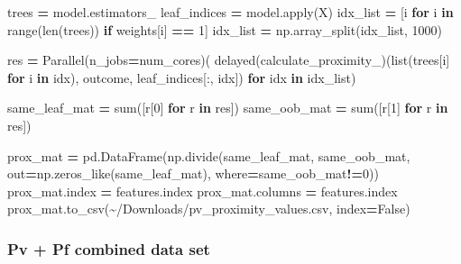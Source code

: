 \documentclass[
  11pt,
  oneside]{book}
\newenvironment{Shaded}{\begin{snugshade}}{\end{snugshade}}
\newcommand{\BuiltInTok}[1]{#1}
\newcommand{\ControlFlowTok}[1]{\textcolor[rgb]{0.13,0.29,0.53}{\textbf{#1}}}
\newcommand{\DecValTok}[1]{\textcolor[rgb]{0.00,0.00,0.81}{#1}}
\newcommand{\KeywordTok}[1]{\textcolor[rgb]{0.13,0.29,0.53}{\textbf{#1}}}
\newcommand{\NormalTok}[1]{#1}
\newcommand{\OperatorTok}[1]{\textcolor[rgb]{0.81,0.36,0.00}{\textbf{#1}}}
\newcommand{\StringTok}[1]{\textcolor[rgb]{0.31,0.60,0.02}{#1}}
\newcommand{\VariableTok}[1]{\textcolor[rgb]{0.00,0.00,0.00}{#1}}
\begin{document}
\begin{Shaded}
\begin{Highlighting}[]
\NormalTok{trees }\OperatorTok{=}\NormalTok{ model.estimators\_}
\NormalTok{leaf\_indices }\OperatorTok{=}\NormalTok{ model.}\BuiltInTok{apply}\NormalTok{(X)}
\NormalTok{idx\_list }\OperatorTok{=}\NormalTok{ [i }\ControlFlowTok{for}\NormalTok{ i }\KeywordTok{in} \BuiltInTok{range}\NormalTok{(}\BuiltInTok{len}\NormalTok{(trees)) }\ControlFlowTok{if}\NormalTok{ weights[i] }\OperatorTok{==} \DecValTok{1}\NormalTok{]}
\NormalTok{idx\_list }\OperatorTok{=}\NormalTok{ np.array\_split(idx\_list, }\DecValTok{1000}\NormalTok{)}

\NormalTok{res }\OperatorTok{=}\NormalTok{ Parallel(n\_jobs}\OperatorTok{=}\NormalTok{num\_cores)(}
\NormalTok{    delayed(calculate\_proximity\_)(}\BuiltInTok{list}\NormalTok{(trees[i] }\ControlFlowTok{for}\NormalTok{ i }\KeywordTok{in}\NormalTok{ idx), outcome, leaf\_indices[:, idx]) }\ControlFlowTok{for}\NormalTok{ idx }\KeywordTok{in}\NormalTok{ idx\_list)}

\NormalTok{same\_leaf\_mat }\OperatorTok{=} \BuiltInTok{sum}\NormalTok{([r[}\DecValTok{0}\NormalTok{] }\ControlFlowTok{for}\NormalTok{ r }\KeywordTok{in}\NormalTok{ res])}
\NormalTok{same\_oob\_mat }\OperatorTok{=} \BuiltInTok{sum}\NormalTok{([r[}\DecValTok{1}\NormalTok{] }\ControlFlowTok{for}\NormalTok{ r }\KeywordTok{in}\NormalTok{ res])}

\NormalTok{prox\_mat }\OperatorTok{=}\NormalTok{ pd.DataFrame(np.divide(same\_leaf\_mat, same\_oob\_mat, out}\OperatorTok{=}\NormalTok{np.zeros\_like(same\_leaf\_mat), }
\NormalTok{                        where}\OperatorTok{=}\NormalTok{same\_oob\_mat}\OperatorTok{!=}\DecValTok{0}\NormalTok{))}
\NormalTok{prox\_mat.index }\OperatorTok{=}\NormalTok{ features.index}
\NormalTok{prox\_mat.columns }\OperatorTok{=}\NormalTok{ features.index}
\NormalTok{prox\_mat.to\_csv(}\StringTok{\textquotesingle{}\textasciitilde{}/Downloads/pv\_proximity\_values.csv\textquotesingle{}}\NormalTok{, index}\OperatorTok{=}\VariableTok{False}\NormalTok{)}
\end{Highlighting}
\end{Shaded}

\hypertarget{pv-pf-combined-data-set-3}{%
\subsubsection{Pv + Pf combined data set}\label{pv-pf-combined-data-set-3}}
\end{document}
